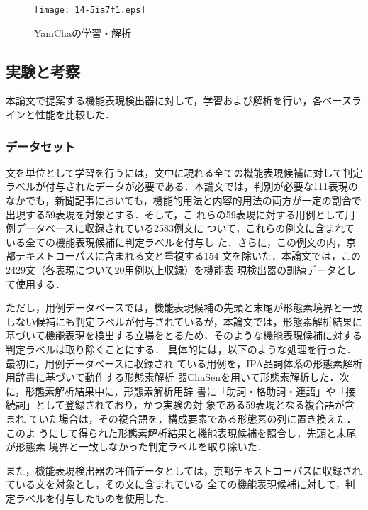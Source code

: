\documentclass[japanese]{jnlp_1.3e}
\begin{document}
\begin{figure}[t]
\begin{center}
\texttt{[image: 14-5ia7f1.eps]}
\end{center}
 \caption{YamChaの学習・解析}
 \label{yamcha}
\end{figure}


\subsection{実験と考察}
\label{subsec:実験と考察}

本論文で提案する機能表現検出器に対して，学習および解析を行い，各ベースラ
インと性能を比較した．

\subsubsection{データセット}
\label{subsec:dataset}

文を単位として学習を行うには，文中に現れる全ての機能表現候補に対して判定
ラベルが付与されたデータが必要である．本論文では，判別が必要な111表現の
なかでも，新聞記事においても，機能的用法と内容的用法の両方が一定の割合で
出現する59表現を対象とする．そして，こ
れらの59表現に対する用例として用例データベースに収録されている2583例文に
ついて，これらの例文に含まれている全ての機能表現候補に判定ラベルを付与し
た．さらに，この例文の内，京都テキストコーパスに含まれる文と重複する154
文を除いた．本論文では，この2429文（各表現について20用例以上収録）を機能表
現検出器の訓練データとして使用する．

ただし，用例データベースでは，機能表現候補の先頭と末尾が形態素境界と一致
しない候補にも判定ラベルが付与されているが，本論文では，形態素解析結果に
基づいて機能表現を検出する立場をとるため，そのような機能表現候補に対する
判定ラベルは取り除くことにする．
具体的には，以下のような処理を行った．最初に，用例データベースに収録され
ている用例を，IPA品詞体系の形態素解析用辞書に基づいて動作する形態素解析
器ChaSenを用いて形態素解析した．次に，形態素解析結果中に，形態素解析用辞
書に「助詞・格助詞・連語」や「接続詞」として登録されており，かつ実験の対
象である59表現となる複合語が含まれ
ていた場合は，その複合語を，構成要素である形態素の列に置き換えた．このよ
うにして得られた形態素解析結果と機能表現候補を照合し，先頭と末尾が形態素
境界と一致しなかった判定ラベルを取り除いた．

また，機能表現検出器の評価データとしては，京都テキストコーパスに収録され
ている文を対象とし，その文に含まれている
全ての機能表現候補に対して，判定ラベルを付与したものを使用した．
\end{document}
